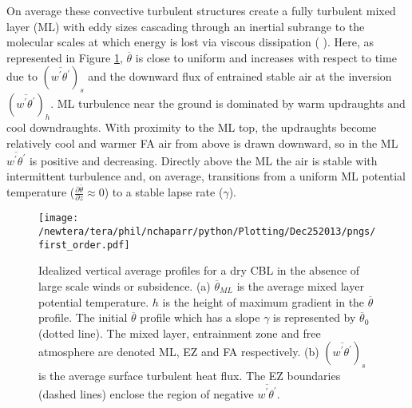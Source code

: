 On average these convective turbulent structures create a fully turbulent mixed layer (\acs{ML}) with eddy sizes cascading through an inertial subrange to the molecular scales at which energy is lost via viscous dissipation (\citeauthor{Stull-BLMetIntro} \citeyear{Stull-BLMetIntro}).  Here, as represented in Figure \ref{fig:1storder}, $\overline{\theta}$ is close to uniform and increases with respect to time due to $(\overline{w^{'}\theta^{'}})_{s}$ and the downward flux of entrained stable air at the inversion $(\overline{w^{'}\theta^{'}})_{h}$.  \acs{ML} turbulence near the ground is dominated by warm updraughts and cool downdraughts.  With proximity to the \acs{ML} top, the updraughts become relatively cool and warmer \acs{FA} air from above is drawn downward, so in the \acs{ML} $\overline{w^{'}\theta^{'}}$ is positive and decreasing.  Directly above the \acs{ML} the air is stable with intermittent turbulence and, on average, transitions from a uniform \acs{ML} potential temperature ($\frac{\partial \overline{\theta}}{\partial z} \approx 0$) to a stable lapse rate ($\gamma$).\\


\begin{figure}[htbp]
    \centering
    \texttt{[image: /newtera/tera/phil/nchaparr/python/Plotting/Dec252013/pngs/first\_order.pdf]}
    \caption[Idealized vertical average profiles for a dry \acs{CBL}]{Idealized vertical average profiles for a dry \acs{CBL} in the absence of large scale winds or subsidence. (a) $\overline{\theta}_{ML}$ is the average mixed layer potential temperature. $h$ is the height of maximum gradient in the $\overline{\theta}$ profile. The initial $\overline{\theta}$ profile which has a slope $\gamma$ is represented by $\overline{\theta}_{0}$ (dotted line). The mixed layer, entrainment zone and free atmosphere are denoted \acs{ML}, \acs{EZ} and \acs{FA} respectively.  (b) $(\overline{w^{'}\theta^{'}})_{s}$ is the average surface turbulent heat flux.  The EZ boundaries (dashed lines) enclose the region of negative $\overline{w^{'}\theta^{'}}$.}
    \label{fig:1storder}   %
\end{figure}

